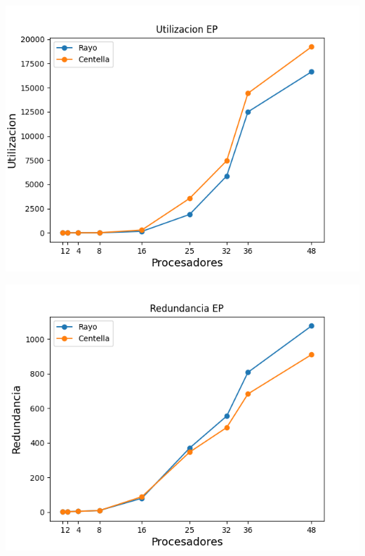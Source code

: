 \begin{center}
 \centering
  \begin{minipage}[b]{.49\textwidth}
  \includegraphics[width=1\linewidth]{plots/utilizacion-ep.png}
 \end{minipage}
 \begin{minipage}[b]{.49\textwidth}
  \includegraphics[width=1\linewidth]{plots/redundancy-ep.png}
 \end{minipage}
\end{center}

